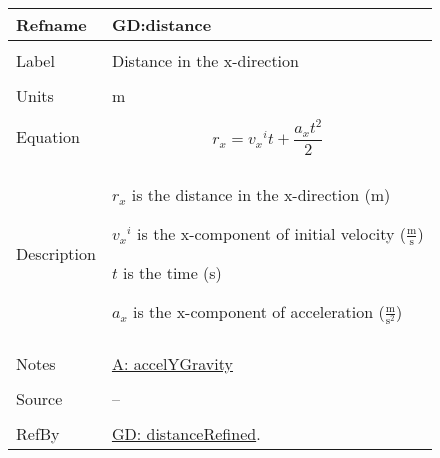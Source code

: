 \documentclass[12pt]{article}
\begin{document}
\noindent \begin{minipage}{\textwidth}
\begin{tabular}{p{} p{}}
\toprule \textbf{Refname} & \textbf{GD:distance}
\label{GD:distance}
\\ \midrule \\
Label & Distance in the x-direction
\\ \midrule \\
Units & m
\\ \midrule \\
Equation & \begin{displaymath}
           {r_{x}}={{v_{x}}^{i}} t+\frac{{a_{x}} t^{2}}{2}
           \end{displaymath}
\\ \midrule \\
Description & \begin{symbDescription}
              \item{${r_{x}}$ is the distance in the x-direction (m)}
              \item{${{v_{x}}^{i}}$ is the x-component of initial velocity ($\frac{\text{m}}{\text{s}}$)}
              \item{$t$ is the time (s)}
              \item{${a_{x}}$ is the x-component of acceleration ($\frac{\text{m}}{\text{s}^{2}}$)}
              \end{symbDescription}
\\ \midrule \\
Notes & \hyperref[accelYGravity]{A: accelYGravity}
\\ \midrule \\
Source & --
\\ \midrule \\
RefBy & \hyperref[GD:distanceRefined]{GD: distanceRefined}.
\\ \bottomrule \end{tabular}
\end{minipage}
\par~
\end{document}
